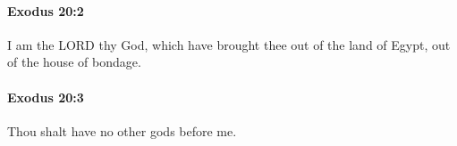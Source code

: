 		\paragraph{Exodus 20:2} %
			\label{EXODUS-20-2}

			I am the LORD thy God, which have brought thee out of the land of Egypt, out of the house of bondage.


		\paragraph{Exodus 20:3} %
			\label{EXODUS-20-3}

			Thou shalt have no other gods before me.


